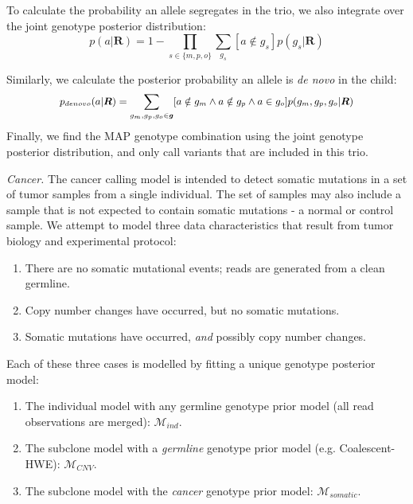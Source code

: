 \documentclass[notitlepage, twocolumn, 10pt]{article}
\begin{document}
To calculate the probability an allele segregates in the trio, we also integrate over the joint genotype posterior distribution:
\begin{equation*}
p(a | \boldsymbol{R}) = 1 - \prod_{s \in \{m, p, o\}}\sum_{g_s} [a \notin g_s]p(g_s | \boldsymbol{R})
\end{equation*}

Similarly, we calculate the posterior probability an allele is \textit{de novo} in the child:
\begin{equation*}
\small
p_{denovo}(a | \boldsymbol{R}) = \sum_{g_m, g_p, g_o \in \boldsymbol{g}} [a \notin g_m \land a \notin g_p \land a \in g_o] p(g_m, g_p, g_o | \boldsymbol{R})
\end{equation*}
Finally, we find the MAP genotype combination using the joint genotype posterior distribution, and only call variants that are included in this trio.

\vspace{3mm}
\noindent\emph{Cancer.} The cancer calling model is intended to detect somatic mutations in a set of tumor samples from a single individual. The set of samples may also include a sample that is not expected to contain somatic mutations - a normal or control sample. We attempt to model three data characteristics that result from tumor biology and experimental protocol: 

\begin{enumerate}[i]
	\item There are no somatic mutational events; reads are generated from a clean germline.
	\item Copy number changes have occurred, but no somatic mutations.
    \item Somatic mutations have occurred, \emph{and} possibly copy number changes.
\end{enumerate}

Each of these three cases is modelled by fitting a unique genotype posterior model:

\begin{enumerate}[i]
	\item The individual model with any germline genotype prior model (all read observations are merged): $\mathcal{M}_{ind}$.
	\item The subclone model with a \emph{germline} genotype prior model (e.g. Coalescent-HWE): $\mathcal{M}_{CNV}$.
    \item The subclone model with the \emph{cancer} genotype prior model: $\mathcal{M}_{somatic}$.
\end{enumerate}
\end{document}
